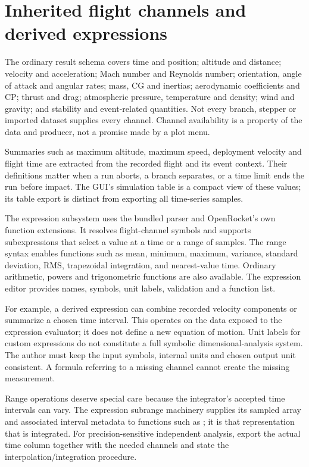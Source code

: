\section{Inherited flight channels and derived expressions}
The ordinary result schema covers time and position; altitude and distance; velocity and acceleration; Mach number and Reynolds number; orientation, angle of attack and angular rates; mass, CG and inertias; aerodynamic coefficients and CP; thrust and drag; atmospheric pressure, temperature and density; wind and gravity; and stability and event-related quantities. Not every branch, stepper or imported dataset supplies every channel. Channel availability is a property of the data and producer, not a promise made by a plot menu.

Summaries such as maximum altitude, maximum speed, deployment velocity and flight time are extracted from the recorded flight and its event context. Their definitions matter when a run aborts, a branch separates, or a time limit ends the run before impact. The GUI's simulation table is a compact view of these values; its table export is distinct from exporting all time-series samples.

The expression subsystem uses the bundled  parser and OpenRocket's own function extensions. It resolves flight-channel symbols and supports subexpressions that select a value at a time or a range of samples. The range syntax enables functions such as mean, minimum, maximum, variance, standard deviation, RMS, trapezoidal integration, and nearest-value time. Ordinary arithmetic, powers and trigonometric functions are also available. The expression editor provides names, symbols, unit labels, validation and a function list.

For example, a derived expression can combine recorded velocity components or summarize a chosen time interval. This operates on the data exposed to the expression evaluator; it does not define a new equation of motion. Unit labels for custom expressions do not constitute a full symbolic dimensional-analysis system. The author must keep the input symbols, internal units and chosen output unit consistent. A formula referring to a missing channel cannot create the missing measurement.

Range operations deserve special care because the integrator's accepted time intervals can vary. The expression subrange machinery supplies its sampled array and associated interval metadata to functions such as ; it is that representation that is integrated. For precision-sensitive independent analysis, export the actual time column together with the needed channels and state the interpolation/integration procedure.

